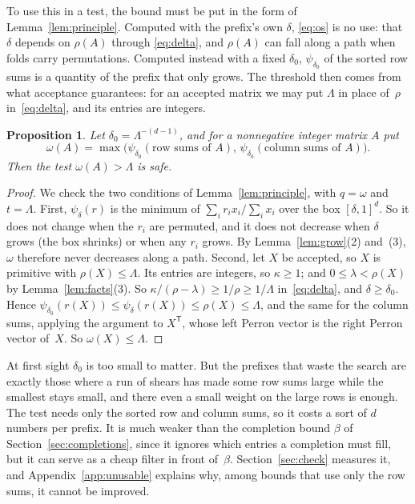 \documentclass[11pt]{amsart}
\newcommand{\lam}{\lambda}
\newcommand{\Lam}{\Lambda}
\theoremstyle{plain}
\newtheorem{Proposition}[Theorem]{Proposition}
\theoremstyle{definition}
\begin{document}
To use this in a test, the bound must be put in the form of
Lemma~\ref{lem:principle}.  Computed with the prefix's own $\delta$,
\eqref{eq:os} is no use: that $\delta$ depends on $\rho(A)$ through
\eqref{eq:delta}, and $\rho(A)$ can fall along a path when folds carry
permutations.  Computed instead with a fixed $\delta_0$, $\psi_{\delta_0}$
of the sorted row sums is a quantity of the prefix that only grows.  The
threshold then comes from what acceptance guarantees: for an accepted
matrix we may put $\Lam$ in place of~$\rho$ in~\eqref{eq:delta}, and its
entries are integers.

\begin{Proposition}
  \label{prop:os}
  Let $\delta_0=\Lam^{-(d-1)}$, and for a nonnegative integer matrix $A$
  put
  \[
    \omega(A)=\max\bigl(\psi_{\delta_0}(\text{row sums of }A),\,
      \psi_{\delta_0}(\text{column sums of }A)\bigr).
  \]
  Then the test $\omega(A)>\Lam$ is safe.
\end{Proposition}

\begin{proof}
  We check the two conditions of Lemma~\ref{lem:principle}, with
  $q=\omega$ and $t=\Lam$.
  First, $\psi_\delta(r)$ is the minimum of $\sum_ir_ix_i/\sum_ix_i$ over
  the box $[\delta,1]^d$.  So it does not change when the $r_i$ are
  permuted, and it does not decrease when $\delta$ grows (the box shrinks)
  or when any $r_i$ grows.  By Lemma~\ref{lem:grow}(2) and~(3), $\omega$
  therefore never decreases along a path.  Second, let $X$ be accepted, so
  $X$ is primitive with $\rho(X)\le\Lam$.  Its entries are integers, so
  $\kappa\ge1$; and $0\le\lam<\rho(X)$ by Lemma~\ref{lem:facts}(3).  So
  $\kappa/(\rho-\lam)\ge1/\rho\ge1/\Lam$ in~\eqref{eq:delta}, and
  $\delta\ge\delta_0$.  Hence
  $\psi_{\delta_0}(r(X))\le\psi_\delta(r(X))\le\rho(X)\le\Lam$, and the
  same for the column sums, applying the argument to $X^{\mathsf T}$, whose
  left Perron vector is the right Perron vector of~$X$.  So
  $\omega(X)\le\Lam$.
\end{proof}

At first sight $\delta_0$ is too small to matter.  But the prefixes that
waste the search are exactly those where a run of shears has made some row
sums large while the smallest stays small, and there even a small weight
on the large rows is enough.  The test needs only the sorted row and
column sums, so it costs a sort of $d$ numbers per prefix.  It is much
weaker than the completion bound $\beta$ of Section~\ref{sec:completions},
since it ignores which entries a completion must fill, but it can serve as
a cheap filter in front of~$\beta$.  Section~\ref{sec:check} measures it,
and Appendix~\ref{app:unusable} explains why, among bounds that use only
the row sums, it cannot be improved.
\end{document}
